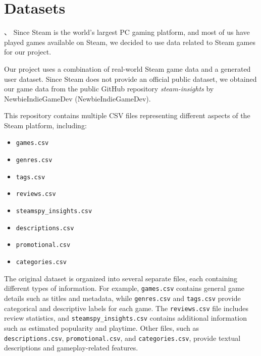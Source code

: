 \documentclass[fontsize=11pt]{article}
\begin{document}
\newpage
\section*{Datasets}
、
Since Steam is the world’s largest PC gaming platform, and most of us have played games available on Steam, we decided to use data related to Steam games for our project.

Our project uses a combination of real-world Steam game data and a generated user dataset. Since Steam does not provide an official public dataset, we obtained our game data from the public GitHub repository \textit{steam-insights} by NewbieIndieGameDev (NewbieIndieGameDev).

This repository contains multiple CSV files representing different aspects of the Steam platform, including:
\begin{itemize}
    \item \texttt{games.csv}
    \item \texttt{genres.csv}
    \item \texttt{tags.csv}
    \item \texttt{reviews.csv}
    \item \texttt{steamspy\_insights.csv}
    \item \texttt{descriptions.csv}
    \item \texttt{promotional.csv}
    \item \texttt{categories.csv}
\end{itemize}

The original dataset is organized into several separate files, each containing different types of information. For example, \texttt{games.csv} contains general game details such as titles and metadata, while \texttt{genres.csv} and \texttt{tags.csv} provide categorical and descriptive labels for each game. The \texttt{reviews.csv} file includes review statistics, and \texttt{steamspy\_insights.csv} contains additional information such as estimated popularity and playtime. Other files, such as \texttt{descriptions.csv}, \texttt{promotional.csv}, and \texttt{categories.csv}, provide textual descriptions and gameplay-related features.
\end{document}
